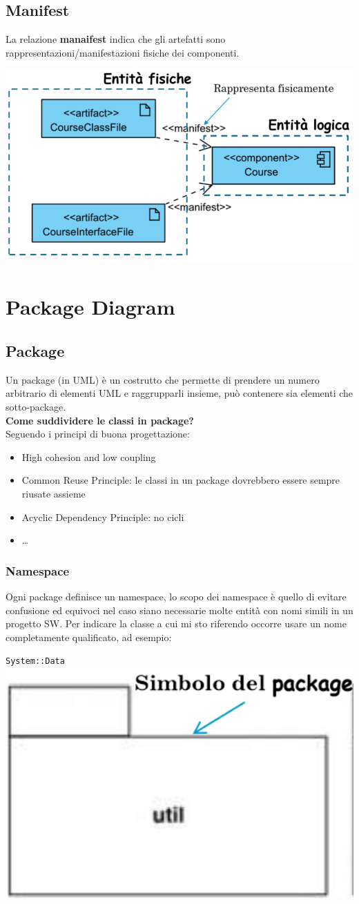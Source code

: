 \documentclass[12pt, a4paper]{report}
\begin{document}
\subsection{Manifest}
La relazione \textbf{manaifest} indica che gli artefatti sono rappresentazioni/manifestazioni fisiche dei componenti.
\begin{center}
    \includegraphics[width=.4\textwidth]{Immagini/manifest.png}
\end{center}
\section{Package Diagram}
\subsection{Package}
Un package (in UML) è un costrutto che permette di prendere un numero arbitrario di elementi UML e raggrupparli insieme, può contenere sia elementi che sotto-package.\\
\textbf{Come suddividere le classi in package?}\\
Seguendo i principi di buona progettazione:
\begin{itemize}
    \item High cohesion and low coupling
    \item Common Reuse Principle: le classi in un package dovrebbero essere sempre riusate assieme
    \item Acyclic Dependency Principle: no cicli
    \item \dots
\end{itemize}
\subsubsection{Namespace}
Ogni package definisce un namespace, lo scopo dei namespace è quello di evitare confusione ed equivoci nel caso siano necessarie molte entità con nomi simili in un progetto SW. Per indicare la classe a cui mi sto riferendo occorre usare un nome completamente qualificato, ad esempio:
\begin{center}
    \texttt{System::Data}\\
    \includegraphics[width=.2\textwidth]{Immagini/package.png}
\end{center}
\end{document}
